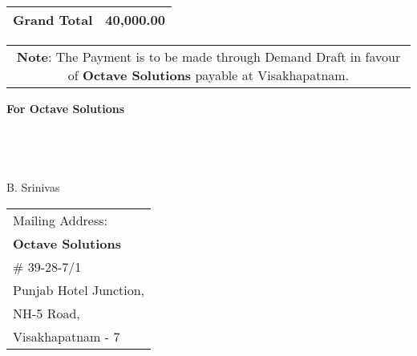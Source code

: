 \documentclass[11pt]{article}
\begin{document}
\vspace*{0.5cm}

\hspace*{12.25cm}
\begin{tabular}{|c|r|}
\hline
{\bf Grand Total} & 40,000.00 \\
\hline
\end{tabular}

\vspace*{-0.4cm}
\begin{tabular}{c}
\parbox{4in}{ {\bf Note}: The Payment is to be made through Demand Draft in favour of {\bf Octave Solutions} payable at Visakhapatnam. }\\
\end{tabular}
\vspace*{85pt}


{\bf For  Octave Solutions } \\ \\ \\ \\ \\
 \hspace*{0.6cm}B. Srinivas
\vspace*{-71pt}
\begin{flushright}
\begin{tabular}{l}
Mailing Address:\\
{\bf Octave Solutions}\\
\# 39-28-7/1\\
Punjab Hotel Junction, \\ 
NH-5 Road, \\
Visakhapatnam - 7\\
\end{tabular}
\end{flushright}
\end{document}
